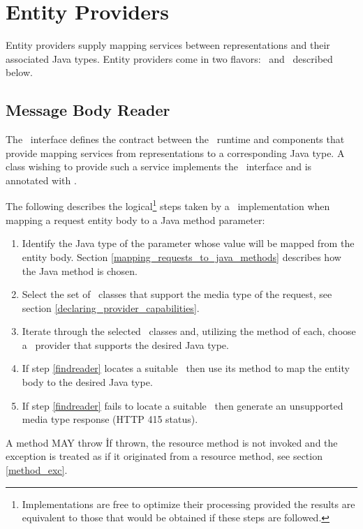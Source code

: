 \section{Entity Providers}
\label{entity_providers}

Entity providers supply mapping services between representations and their associated Java types. Entity providers come in two flavors: \MsgRead\ and \MsgWrite\ described below.

\subsection{Message Body Reader}
\label{message_body_reader}

The \MsgRead\ interface defines the contract between the \jaxrs\ runtime and components that provide mapping services from representations to a corresponding Java type. A class wishing to provide such a service implements the \MsgRead\ interface and is annotated with \Provider.

The following describes the logical\footnote{Implementations are free to optimize their processing provided the results are equivalent to those that would be obtained if these steps are followed.} steps taken by a \jaxrs\ implementation when mapping a request entity body to a Java method parameter:

\begin{enumerate}
\item Identify the Java type of the parameter whose value will be mapped from the entity body. Section \ref{mapping_requests_to_java_methods} describes how the Java method is chosen.
\item Select the set of \MsgRead\ classes that support the media type of the request, see section \ref{declaring_provider_capabilities}.
\item\label{findreader} Iterate through the selected \MsgRead\ classes and, utilizing the  method of each, choose a \MsgRead\ provider that supports the desired Java type.
\item If step \ref{findreader} locates a suitable \MsgRead\ then use its  method to map the entity body to the desired Java type.
\item If step \ref{findreader} fails to locate a suitable \MsgRead\ then generate an unsupported media type response (HTTP 415 status).
\end{enumerate}

A \MsgRead{} method MAY throw \WebAppExc\. If thrown, the resource method is not invoked and the exception is treated as if it originated from a resource method, see section \ref{method_exc}.

